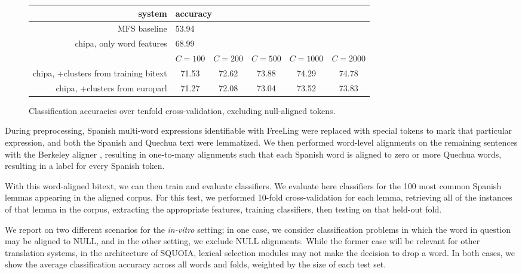 \begin{figure*}[t!]
  \begin{center}
  \begin{tabular}{|r|c|c|c|c|c|}
    \hline
    system                    & \multicolumn{5}{|l|}{accuracy} \\
    \hline
    MFS baseline              &  \multicolumn{5}{|l|}{53.94} \\
    chipa, only word features &  \multicolumn{5}{|l|}{68.99} \\
    \hline
           & $C=100$ & $C=200$ & $C=500$ & $C=1000$ & $C=2000$ \\
    \hline
    chipa, +clusters from training bitext &
    71.53 & 72.62 & 73.88 & 74.29 & 74.78 \\
    chipa, +clusters from europarl        &
    71.27 & 72.08 & 73.04 & 73.52 & 73.83 \\
    \hline
  \end{tabular}
  \end{center}
\caption{Classification accuracies over tenfold cross-validation, excluding
null-aligned tokens.}
\label{fig:integrationresults2}
\end{figure*}


During preprocessing, Spanish multi-word expressions identifiable with FreeLing
were replaced with special tokens to mark that particular expression, and both
the Spanish and Quechua text were lemmatized. We then performed word-level
alignments on the remaining sentences with the Berkeley aligner
\cite{denero-klein:2007:ACLMain}, resulting in one-to-many alignments such that
each Spanish word is aligned to zero or more Quechua words, resulting in a
label for every Spanish token.

With this word-aligned bitext, we can then train and evaluate classifiers.
We evaluate here classifiers for the 100 most common Spanish lemmas appearing
in the aligned corpus. For this test, we performed 10-fold cross-validation for
each lemma, retrieving all of the instances of that lemma in the corpus,
extracting the appropriate features, training classifiers, then testing on
that held-out fold.

We report on two different scenarios for the \emph{in-vitro} setting; in one
case, we consider classification problems in which the word in question may be
aligned to NULL, and in the other setting, we exclude NULL alignments. While
the former case will be relevant for other translation systems, in the
architecture of SQUOIA, lexical selection modules may not make the decision to
drop a word. In both cases, we show the average classification accuracy across
all words and folds, weighted by the size of each test set.


